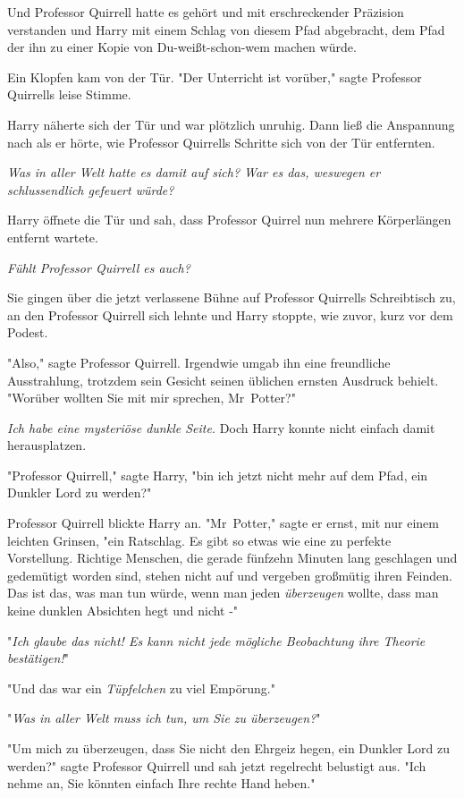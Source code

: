 {Und Professor Quirrell hatte es gehört und mit erschreckender Präzision verstanden und Harry mit einem Schlag von diesem Pfad abgebracht, dem Pfad der ihn zu einer Kopie von Du-weißt-schon-wem machen würde.

Ein Klopfen kam von der Tür. "Der Unterricht ist vorüber," sagte Professor Quirrells leise Stimme.

Harry näherte sich der Tür und war plötzlich unruhig. Dann ließ die Anspannung nach als er hörte, wie Professor Quirrells Schritte sich von der Tür entfernten.

\emph{Was in aller Welt hatte es damit auf sich? War es das, weswegen er schlussendlich gefeuert würde?}

Harry öffnete die Tür und sah, dass Professor Quirrel nun mehrere Körperlängen entfernt wartete.

\emph{Fühlt Professor Quirrell es auch?}

Sie gingen über die jetzt verlassene Bühne auf Professor Quirrells Schreibtisch zu, an den Professor Quirrell sich lehnte und Harry stoppte, wie zuvor, kurz vor dem Podest.

"Also," sagte Professor Quirrell. Irgendwie umgab ihn eine freundliche Ausstrahlung, trotzdem sein Gesicht seinen üblichen ernsten Ausdruck behielt. "Worüber wollten Sie mit mir sprechen, Mr~Potter?"

\emph{Ich habe eine mysteriöse dunkle Seite.} Doch Harry konnte nicht einfach damit herausplatzen.

"Professor Quirrell," sagte Harry, "bin ich jetzt nicht mehr auf dem Pfad, ein Dunkler Lord zu werden?"

Professor Quirrell blickte Harry an. "Mr~Potter," sagte er ernst, mit nur einem leichten Grinsen, "ein Ratschlag. Es gibt so etwas wie eine zu perfekte Vorstellung. Richtige Menschen, die gerade fünfzehn Minuten lang geschlagen und gedemütigt worden sind, stehen nicht auf und vergeben großmütig ihren Feinden. Das ist das, was man tun würde, wenn man jeden \emph{überzeugen} wollte, dass man keine dunklen Absichten hegt und nicht -"

"\emph{Ich glaube das nicht! Es kann nicht jede mögliche Beobachtung ihre Theorie bestätigen!}"

"Und das war ein \emph{Tüpfelchen} zu viel Empörung."

"\emph{Was in aller Welt muss ich tun, um Sie zu überzeugen?}"

"Um mich zu überzeugen, dass Sie nicht den Ehrgeiz hegen, ein Dunkler Lord zu werden?" sagte Professor Quirrell und sah jetzt regelrecht belustigt aus. "Ich nehme an, Sie könnten einfach Ihre rechte Hand heben."

}
